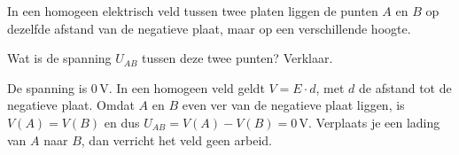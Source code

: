 \documentclass{ximera}
\begin{document}
\begin{question}
    In een homogeen elektrisch veld tussen twee platen liggen de punten $A$ en $B$ op dezelfde afstand van de negatieve plaat, maar op een verschillende hoogte.

    \begin{center}
    \end{center}

    Wat is de spanning $U_{AB}$ tussen deze twee punten? Verklaar.

    \begin{solution}\nl
        De spanning is $0 \, \mathrm{V}$. In een homogeen veld geldt $V = E \cdot d$, met $d$ de afstand tot de negatieve plaat. Omdat $A$ en $B$ even ver van de negatieve plaat liggen, is $V(A) = V(B)$ en dus $U_{AB} = V(A) - V(B) = 0 \, \mathrm{V}$. Verplaats je een lading van $A$ naar $B$, dan verricht het veld geen arbeid.
    \end{solution}
\end{question}
\end{document}
